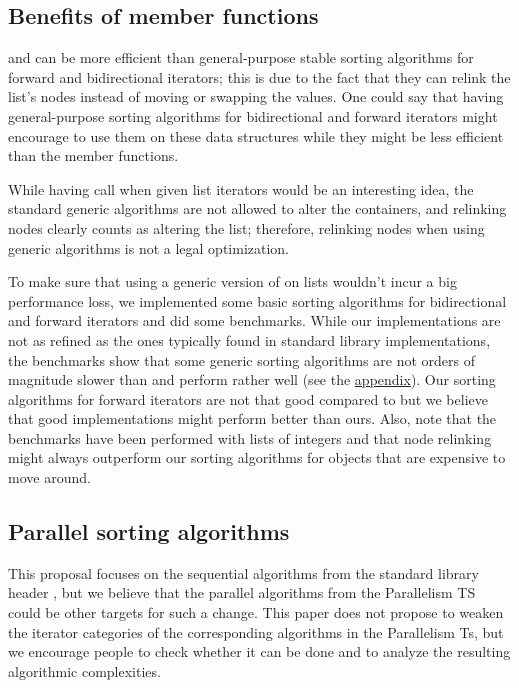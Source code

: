 \documentclass{isocpp_proposal}
\begin{document}
\subsection{Benefits of  member functions}

 and  can be more efficient than general-purpose stable sorting algorithms for forward and bidirectional iterators; this is due to the fact that they can relink the list's nodes instead of moving or swapping the values. One could say that having general-purpose sorting algorithms for bidirectional and forward iterators might encourage to use them on these data structures while they might be less efficient than the member functions.

\vspace{0.3cm}

While having  call  when given list iterators would be an interesting idea, the standard generic algorithms are not allowed to alter the containers, and relinking nodes clearly counts as altering the list; therefore, relinking nodes when using generic algorithms is not a legal optimization.

\vspace{0.3cm}

To make sure that using a generic version of  on lists wouldn't incur a big performance loss, we implemented some basic sorting algorithms for bidirectional and forward iterators and did some benchmarks. While our implementations are not as refined as the ones typically found in standard library implementations, the benchmarks show that some generic sorting algorithms are not orders of magnitude slower than  and perform rather well (see the \hyperref[App:Benchmarks]{appendix}). Our sorting algorithms for forward iterators are not that good compared to  but we believe that good implementations might perform better than ours. Also, note that the benchmarks have been performed with lists of integers and that node relinking might always outperform our sorting algorithms for objects that are expensive to move around.

\subsection{Parallel sorting algorithms}

This proposal focuses on the sequential algorithms from the standard library header , but we believe that the parallel algorithms from the Parallelism TS \cite{N4507} could be other targets for such a change. This paper does not propose to weaken the iterator categories of the corresponding algorithms in the Parallelism Ts, but we encourage people to check whether it can be done and to analyze the resulting algorithmic complexities.
\end{document}
